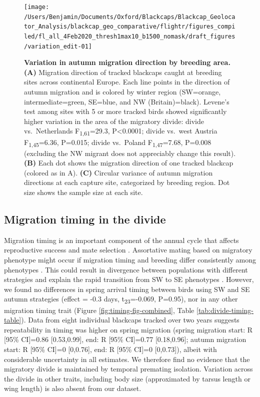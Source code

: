 \documentclass[a4paper, twoside]{templates/ociamthesis}
\begin{document}
\begin{figure}
\texttt{[image: /Users/Benjamin/Documents/Oxford/Blackcaps/Blackcap\_Geolocator\_Analysis/blackcap\_geo\_comparative/flightr/figures\_compiled/fl\_all\_4Feb2020\_thresh1max10\_b1500\_nomask/draft\_figures/variation\_edit-01]} \caption{\textbf{Variation in autumn migration direction by breeding area.} \textbf{(A)} Migration direction of tracked blackcaps caught at breeding sites across continental Europe. Each line points in the direction of autumn migration and is colored by winter region (SW=orange, intermediate=green, SE=blue, and NW (Britain)=black). Levene's test among sites with 5 or more tracked birds showed significantly higher variation in the area of the migratory divide: divide vs.~Netherlands F\textsubscript{1,61}=29.3, P\textless0.0001; divide vs.~west Austria F\textsubscript{1,45}=6.36, P=0.015; divide vs.~Poland F\textsubscript{1,47}=7.68, P=0.008 (excluding the NW migrant does not appreciably change this result). \textbf{(B)} Each dot shows the migration direction of one tracked blackcap (colored as in A). \textbf{(C)} Circular variance of autumn migration directions at each capture site, categorized by breeding region. Dot size shows the sample size at each site.}\label{fig:var-fig-edit}
\end{figure}

\hypertarget{migration-timing-in-the-divide}{%
\subsection{Migration timing in the divide}\label{migration-timing-in-the-divide}}

Migration timing is an important component of the annual cycle that affects reproductive success \autocite{taylorRoleAllochronySpeciation2017,winkerOriginSpeciesHeteropatric2010} and mate selection \autocite{bearhopAssortativeMatingMechanism2005}. Assortative mating based on migratory phenotype might occur if migration timing and breeding differ consistently among phenotypes \autocite{bearhopAssortativeMatingMechanism2005}. This could result in divergence between populations with different strategies and explain the rapid transition from SW to SE phenotypes \autocite{irwinSiberianMigratoryDivides2005}. However, we found no differences in spring arrival timing between birds using SW and SE autumn strategies (effect = -0.3 days, t\textsubscript{23}=-0.069, P=0.95), nor in any other migration timing trait (Figure \ref{fig:timing-fig-combined}, Table \ref{tab:divide-timing-table}). Data from eight individual blackcaps tracked over two years suggests repeatability in timing was higher on spring migration (spring migration start: R {[}95\% CI{]}=0.86 {[}0.53,0.99{]}, end: R {[}95\% CI{]}=0.77 {[}0.18,0.96{]}; autumn migration start: R {[}95\% CI{]}=0 {[}0,0.76{]}, end: R {[}95\% CI{]}=0 {[}0,0.73{]}), albeit with considerable uncertainty in all estimates. We therefore find no evidence that the migratory divide is maintained by temporal premating isolation. Variation across the divide in other traits, including body size (approximated by tarsus length or wing length) is also absent from our dataset.
\end{document}
